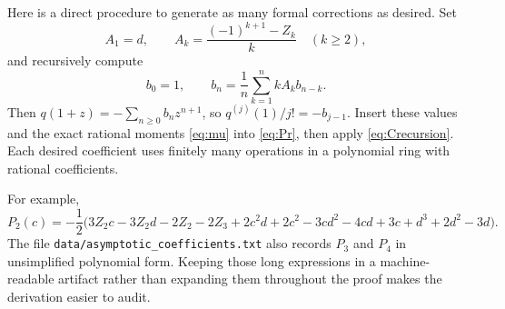\documentclass[11pt]{article}
\numberwithin{equation}{section}
\theoremstyle{definition}
\begin{document}
Here is a direct procedure to generate as many formal corrections as
desired. Set
\[
 A_1=d,\qquad A_k=\frac{(-1)^{k+1}-Z_k}{k}\quad(k\ge2),
\]
and recursively compute
\[
 b_0=1,\qquad b_n=\frac1n\sum_{k=1}^n kA_kb_{n-k}.
\]
Then $q(1+z)=-\sum_{n\ge0}b_nz^{n+1}$, so
$q^{(j)}(1)/j!=-b_{j-1}$. Insert these values and the exact rational
moments \eqref{eq:mu} into \eqref{eq:Pr}, then apply
\eqref{eq:Crecursion}. Each desired coefficient uses finitely many
operations in a polynomial ring with rational coefficients.

For example,
\[
 P_2(c)= -\frac12\bigl(3Z_2c-3Z_2d-2Z_2-2Z_3
        +2c^2d+2c^2-3cd^2-4cd+3c+d^3+2d^2-3d\bigr).
\]
The file \texttt{data/asymptotic\_coefficients.txt} also records $P_3$ and
$P_4$ in unsimplified polynomial form. Keeping those long expressions in
a machine-readable artifact rather than expanding them throughout the
proof makes the derivation easier to audit.
\end{document}
